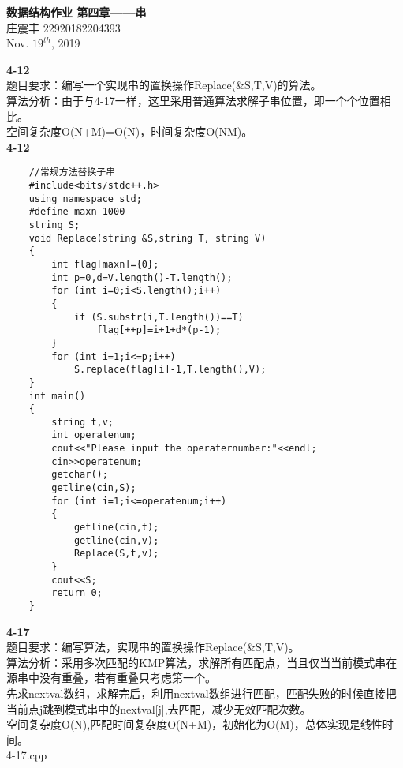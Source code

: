 \documentclass[UTF8,a4paper]{article}
\begin{document}
\begin{center}
    \textbf{\LARGE{数据结构作业 第四章——串}}\\[0.5cm]
    \normalsize{庄震丰 22920182204393}\\[0.3cm]
    \large{Nov. $19^{th}$, 2019}
\end{center}
\textbf{4-12}\\
题目要求：编写一个实现串的置换操作Replace(\&S,T,V)的算法。\\
算法分析：由于与4-17一样，这里采用普通算法求解子串位置，即一个个位置相比。\\
空间复杂度O(N+M)=O(N)，时间复杂度O(NM)。\\
\textbf{4-12}\\
\begin{lstlisting}
    //常规方法替换子串
    #include<bits/stdc++.h>
    using namespace std;
    #define maxn 1000
    string S;
    void Replace(string &S,string T, string V)
    {
        int flag[maxn]={0};
        int p=0,d=V.length()-T.length();
        for (int i=0;i<S.length();i++)
        {
            if (S.substr(i,T.length())==T)
                flag[++p]=i+1+d*(p-1);
        }
        for (int i=1;i<=p;i++)
            S.replace(flag[i]-1,T.length(),V);
    }
    int main()
    {
        string t,v;
        int operatenum;
        cout<<"Please input the operaternumber:"<<endl;
        cin>>operatenum;
        getchar();
        getline(cin,S);
        for (int i=1;i<=operatenum;i++)
        {
            getline(cin,t);
            getline(cin,v);
            Replace(S,t,v);
        }
        cout<<S;
        return 0;
    }
\end{lstlisting}
\textbf{4-17}\\
题目要求：编写算法，实现串的置换操作Replace(\&S,T,V)。\\
算法分析：采用多次匹配的KMP算法，求解所有匹配点，当且仅当当前模式串在源串中没有重叠，若有重叠只考虑第一个。\\
先求nextval数组，求解完后，利用nextval数组进行匹配，匹配失败的时候直接把当前点j跳到模式串中的nextval[j],去匹配，减少无效匹配次数。\\
空间复杂度O(N),匹配时间复杂度O(N+M)，初始化为O(M)，总体实现是线性时间。\\
4-17.cpp\\
\end{document}

